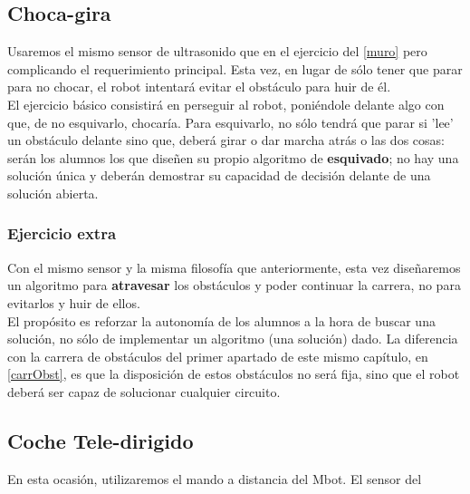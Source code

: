 \subsection{Choca-gira}
Usaremos el mismo sensor de ultrasonido que en el ejercicio del \ref{muro} pero complicando el requerimiento principal. Esta vez, en lugar de sólo tener que parar para no chocar, el robot intentará evitar el obstáculo para huir de él. \\
El ejercicio básico consistirá en perseguir al robot, poniéndole delante algo con que, de no esquivarlo, chocaría. Para esquivarlo, no sólo tendrá que parar si 'lee' un obstáculo delante sino que, deberá girar o dar marcha atrás o las dos cosas: serán los alumnos los que diseñen su propio algoritmo de \textbf{esquivado}; no hay una solución única y deberán demostrar su capacidad de decisión delante de una solución abierta.
\subsubsection{Ejercicio extra}
Con el mismo sensor y la misma filosofía que anteriormente, esta vez diseñaremos un algoritmo para \textbf{atravesar} los obstáculos y poder continuar la carrera, no para evitarlos y huir de ellos. \\
El propósito es reforzar la autonomía de los alumnos a la hora de buscar una solución, no sólo de implementar un algoritmo (una solución) dado. La diferencia con la carrera de obstáculos del primer apartado de este mismo capítulo, en \ref{carrObst}, es que la disposición de estos obstáculos no será fija, sino que el robot deberá ser capaz de solucionar cualquier circuito.
\subsection{Coche Tele-dirigido}
En esta ocasión, utilizaremos el mando a distancia del Mbot. El sensor del 
